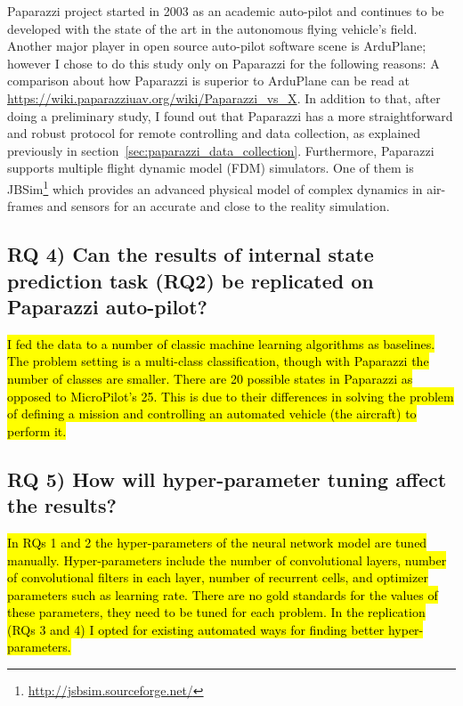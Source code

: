 Paparazzi \cite{hattenberger2014using} project started in 2003 as an academic auto-pilot and continues to be developed with the state of the art in the autonomous flying vehicle's field. Another major player in open source auto-pilot software scene is ArduPlane; however I chose to do this study only on Paparazzi for the following reasons:
A comparison about how Paparazzi is superior to ArduPlane can be read at \url{https://wiki.paparazziuav.org/wiki/Paparazzi_vs_X}. 
In addition to that, after doing a preliminary study, I found out that Paparazzi has a more straightforward and robust protocol for remote controlling and data collection, as explained previously in section~\ref{sec:paparazzi_data_collection}. 
Furthermore, Paparazzi supports multiple flight dynamic model (FDM) simulators. One of them is JBSim\footnote{\url{http://jsbsim.sourceforge.net/}} which provides an advanced physical model of complex dynamics in air-frames and sensors for an accurate and close to the reality simulation. 



\subsection{RQ 4) Can the results of internal state prediction task (RQ2) be replicated on Paparazzi auto-pilot?}
\hl{I fed the data to a number of classic machine learning algorithms as baselines. The problem setting is a multi-class classification, though with Paparazzi the number of classes are smaller. 
There are 20 possible states in Paparazzi as opposed to MicroPilot's 25. This is due to their differences in solving the problem of defining a mission and controlling an automated vehicle (the aircraft) to perform it.}

\subsection{RQ 5) How will hyper-parameter tuning affect the results?}
\hl{In RQs 1 and 2 the hyper-parameters of the neural network model are tuned manually. Hyper-parameters include the number of convolutional layers, number of convolutional filters in each layer, number of recurrent cells, and optimizer parameters such as learning rate. There are no gold standards for the values of these parameters, they need to be tuned for each problem. In the replication (RQs 3 and 4) I opted for existing automated ways for finding better hyper-parameters.}

